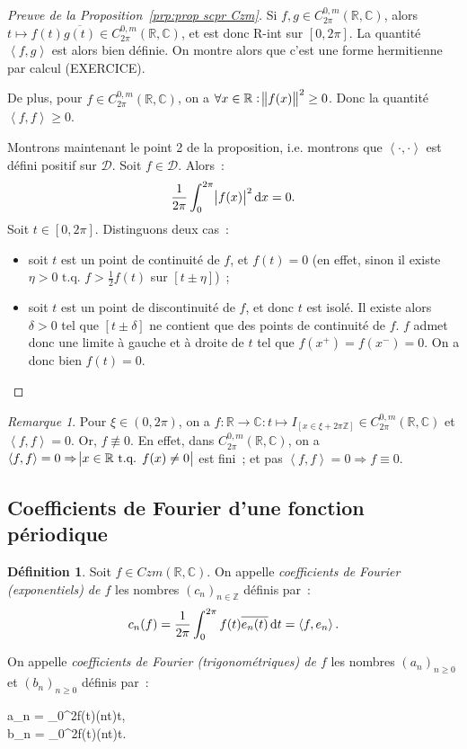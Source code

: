 \documentclass{report}
\theoremstyle{definition}
\newtheorem{déf}[thm]{Définition}
\theoremstyle{remark}
\newtheorem*{rmq}{Remarque}
\numberwithin{equation}{section}
\newcommand{\C}{\mathbb C}
\newcommand{\R}{\mathbb R}
\newcommand{\Z}{\mathbb Z}
\newcommand{\tq}{\text{ t.q. }}
\newcommand{\scpr}[2]{\left\langle #1, #2\right\rangle}
\newcommand{\CzmT}[1]{C^{0,m}_{#1}}
\newcommand{\Czm}{\CzmT{2\pi}}
\begin{document}
			\begin{proof}[Preuve de la Proposition~\ref{prp:prop scpr Czm}] Si $f, g \in \Czm(\R, \C)$, alors $t \mapsto f(t)\overline {g(t)} \in \Czm(\R, \C)$,
			et est donc R-int sur $[0, 2\pi]$. La quantité $\scpr fg$ est alors bien définie. On montre alors que c'est une forme hermitienne par calcul (EXERCICE).

			De plus, pour $f \in \Czm(\R, \C)$, on a $\forall x \in \R : \norm {f(x)}^2 \geq 0$. Donc la quantité $\scpr ff \geq 0$.

			Montrons maintenant le point 2 de la proposition, i.e. montrons que $\scpr \cdot\cdot$ est défini positif sur $\mathcal D$. Soit $f \in \mathcal D$.
			Alors~:
			\begin{equation}
				\frac 1{2\pi}\int_0^{2\pi}\abs {f(x)}^2\dif x = 0.
			\end{equation}
			Soit $t \in [0, 2\pi]$. Distinguons deux cas~:
			\begin{itemize}
				\item soit $t$ est un point de continuité de $f$, et $f(t) = 0$ (en effet, sinon il existe $\eta > 0 \tq f > \frac 12f(t)$ sur $[t \pm \eta]$)~;
				\item soit $t$ est un point de discontinuité de $f$, et donc $t$ est isolé. Il existe alors $\delta > 0$ tel que $[t \pm \delta]$ ne contient que des
				points de continuité de $f$. $f$ admet donc une limite à gauche et à droite de $t$ tel que $f(x^+) = f(x^-) = 0$. On a donc bien $f(t) = 0$.
			\end{itemize}
			\end{proof}

			\begin{rmq} Pour $\xi \in (0, 2\pi)$, on a $f : \R \to \C : t \mapsto I_{[x \in \xi + 2\pi\Z]} \in \Czm(\R, \C)$ et $\scpr ff = 0$. Or, $f \not \equiv 0$.
			En effet, dans $\Czm(\R, \C)$, on a $\scpr ff = 0 \Rightarrow \abs {x \in \R \tq f(x) \neq 0}$ est fini~; et pas $\scpr ff = 0 \Rightarrow f \equiv 0$.
			\end{rmq}

		\subsection{Coefficients de Fourier d'une fonction périodique}
			\begin{déf} Soit $f \in Czm(\R, \C)$. On appelle \textit{coefficients de Fourier (exponentiels) de $f$} les nombres $(c_n)_{n \in \Z}$ définis par~:
			\begin{equation}
				c_n(f) = \frac 1{2\pi}\int_0^{2\pi}f(t)\overline {e_n(t)}\dif t = \scpr f{e_n}.
			\end{equation}

			On appelle \textit{coefficients de Fourier (trigonométriques) de $f$} les nombres $(a_n)_{n \geq 0}$ et $(b_n)_{n \geq 0}$ définis par~:
			\begin{subnumcases}{}
				a_n = \pi\int_0^{2\pi}f(t)\cos(nt)\dif t, \\
				b_n = \pi\int_0^{2\pi}f(t)\sin(nt)\dif t.
			\end{subnumcases}
			\end{déf}
\end{document}
